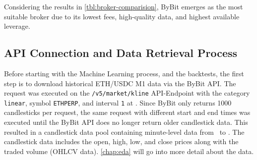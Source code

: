 Considering the results in \autoref{tbl:broker-comparision}, ByBit emerges as the most suitable broker due to its lowest fees, high-quality data, and highest available leverage.


\subsection{API Connection and Data Retrieval Process}
\label{chap:api-connection}

Before starting with the Machine Learning process, and the backtests, the first step is to download historical ETH/USDC M1 data via the ByBit API.
The request was executed on the \texttt{/v5/market/kline} API-Endpoint \cite{bybit-api-doc-get-kline} with the category \texttt{linear}, symbol \texttt{ETHPERP}, and interval \texttt{1} at \ethDataEndDate.
Since ByBit only returns 1000 candlesticks per request, the same request with different start and end times was executed until the ByBit API does no longer return older candlestick data.
This resulted in a candlestick data pool containing minute-level data from \ethDataStartDate~to \ethDataEndDate.
The candlestick data includes the open, high, low, and close prices along with the traded volume (OHLCV data).
\autoref{chap:eda} will go into more detail about the data.